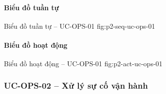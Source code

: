 \clearpage
\paragraph{Biểu đồ tuần tự}
  {Biểu đồ tuần tự -- UC-OPS-01}
  {fig:p2-seq-uc-ops-01}

\clearpage
\paragraph{Biểu đồ hoạt động}
  {Biểu đồ hoạt động -- UC-OPS-01}
  {fig:p2-act-uc-ops-01}

\clearpage

\subsubsection{UC-OPS-02 -- Xử lý sự cố vận hành}


